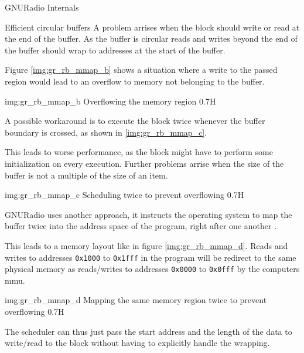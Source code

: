 \begin{subchapter}{GNURadio Internals}
\begin{subsubchapter}{Efficient circular buffers}
    A problem arrises when the block should write or read
    at the end of the buffer.
    As the buffer is circular reads and writes beyond the
    end of the buffer should wrap to addresses at the start of the
    buffer.

    Figure \ref{img:gr_rb_mmap_b} shows a situation where
    a write to the passed region would lead to an overflow
    to memory not belonging to the buffer.

                 {img:gr_rb_mmap_b}
                 {Overflowing the memory region}
                 {0.7}{H}

    A possible workaround is to execute the block
    twice whenever the buffer boundary is crossed,
    as shown in \ref{img:gr_rb_mmap_c}.

    This leads to worse performance, as the block might have
    to perform some initialization on every execution.
    Further problems arrise when the size of the buffer is not
    a multiple of the size of an item.

                 {img:gr_rb_mmap_c}
                 {Scheduling twice to prevent overflowing}
                 {0.7}{H}

    GNURadio uses another approach, it instructs the operating system
    to map the buffer twice into the address space of the program,
    right after one another \cite{grrdbufmmap}.

    This leads to a memory layout like in figure \ref{img:gr_rb_mmap_d}.
    Reads and writes to addresses \texttt{0x1000} to \texttt{0x1fff} in the program
    will be redirect to the same physical memory as reads/writes to addresses
    \texttt{0x0000} to \texttt{0x0fff} by the computers \gls{mmu}.

                 {img:gr_rb_mmap_d}
                 {Mapping the same memory region twice to prevent overflowing}
                 {0.7}{H}

    The scheduler can thus just pass the start address and the length of
    the data to write/read to the block without having to explicitly handle
    the wrapping.
  \end{subsubchapter}
\end{subchapter}

